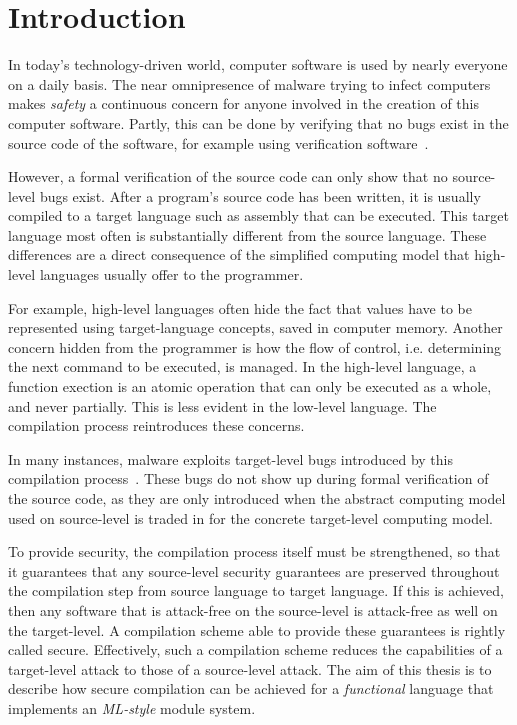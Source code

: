 \chapter{Introduction}

In today's technology-driven world, computer software is used by nearly everyone on a daily basis.
The near omnipresence of malware trying to infect computers makes \emph{safety} a continuous concern for anyone involved in the creation of this computer software.
Partly, this can be done by verifying that no bugs exist in the source code of the software, for example using verification software~\cite{Verifast:paper,Verifast:tutorial}.

However, a formal verification of the source code can only show that no source-level bugs exist.
After a program's source code has been written, it is usually compiled to a target language such as assembly that can be executed.
This target language most often is substantially different from the source language.
These differences are a direct consequence of the simplified computing model that high-level languages usually offer to the programmer.

For example, high-level languages often hide the fact that values have to be represented using target-language concepts, saved in computer memory.
Another concern hidden from the programmer is how the flow of control, i.e. determining the next command to be executed, is managed.
In the high-level language, a function exection is an atomic operation that can only be executed as a whole, and never partially. This is less evident in the low-level language.
The compilation process reintroduces these concerns.

In many instances, malware exploits target-level bugs introduced by this compilation process~\cite{OVSPaper,Younan:2012:RCC:2187671.2187679}.
These bugs do not show up during formal verification of the source code, as they are only introduced when the abstract computing model used on source-level is traded in for the concrete target-level computing model.

To provide security, the compilation process itself must be strengthened, so that it guarantees that any source-level security guarantees are preserved throughout the compilation step from source language to target language.
If this is achieved, then any software that is attack-free on the source-level is attack-free as well on the target-level.
A compilation scheme able to provide these guarantees is rightly called secure.
Effectively, such a compilation scheme reduces the capabilities of a target-level attack to those of a source-level attack.
The aim of this thesis is to describe how secure compilation can be achieved for a \emph{functional} language that implements an \emph{ML-style} module system.

